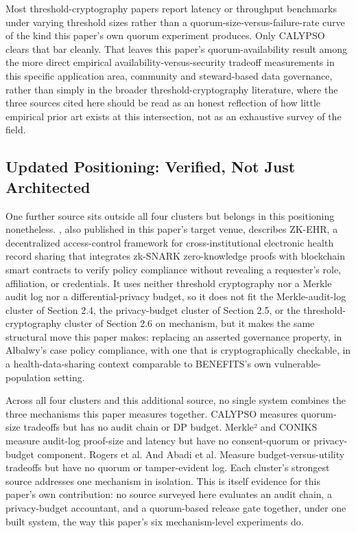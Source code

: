 Most threshold-cryptography papers report latency or throughput benchmarks under varying threshold sizes rather than a quorum-size-versus-failure-rate curve of the kind this paper's own quorum experiment produces. Only CALYPSO clears that bar cleanly. That leaves this paper's quorum-availability result among the more direct empirical availability-versus-security tradeoff measurements in this specific application area, community and steward-based data governance, rather than simply in the broader threshold-cryptography literature, where the three sources cited here should be read as an honest reflection of how little empirical prior art exists at this intersection, not as an exhaustive survey of the field.

\subsection{Updated Positioning: Verified, Not Just Architected}

One further source sits outside all four clusters but belongs in this positioning nonetheless. \cite{albalwy2026}, also published in this paper's target venue, describes ZK-EHR, a decentralized access-control framework for cross-institutional electronic health record sharing that integrates zk-SNARK zero-knowledge proofs with blockchain smart contracts to verify policy compliance without revealing a requester's role, affiliation, or credentials. It uses neither threshold cryptography nor a Merkle audit log nor a differential-privacy budget, so it does not fit the Merkle-audit-log cluster of Section 2.4, the privacy-budget cluster of Section 2.5, or the threshold-cryptography cluster of Section 2.6 on mechanism, but it makes the same structural move this paper makes: replacing an asserted governance property, in Albalwy's case policy compliance, with one that is cryptographically checkable, in a health-data-sharing context comparable to BENEFITS's own vulnerable-population setting.

Across all four clusters and this additional source, no single system combines the three mechanisms this paper measures together. CALYPSO measures quorum-size tradeoffs but has no audit chain or DP budget. Merkle² and CONIKS measure audit-log proof-size and latency but have no consent-quorum or privacy-budget component. Rogers et al. And Abadi et al. Measure budget-versus-utility tradeoffs but have no quorum or tamper-evident log. Each cluster's strongest source addresses one mechanism in isolation. This is itself evidence for this paper's own contribution: no source surveyed here evaluates an audit chain, a privacy-budget accountant, and a quorum-based release gate together, under one built system, the way this paper's six mechanism-level experiments do.

